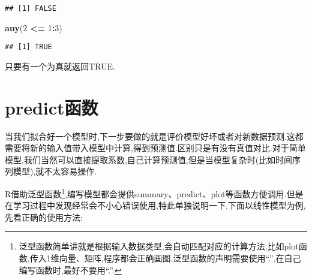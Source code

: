 \documentclass[]{ctexbook}
\newenvironment{Shaded}{\begin{snugshade}}{\end{snugshade}}
\newcommand{\DataTypeTok}[1]{\textcolor[rgb]{0.13,0.29,0.53}{#1}}
\newcommand{\DecValTok}[1]{\textcolor[rgb]{0.00,0.00,0.81}{#1}}
\newcommand{\KeywordTok}[1]{\textcolor[rgb]{0.13,0.29,0.53}{\textbf{#1}}}
\newcommand{\NormalTok}[1]{#1}
\newcommand{\OperatorTok}[1]{\textcolor[rgb]{0.81,0.36,0.00}{\textbf{#1}}}
\newcommand{\StringTok}[1]{\textcolor[rgb]{0.31,0.60,0.02}{#1}}
\begin{document}
\begin{verbatim}
## [1] FALSE
\end{verbatim}

\begin{Shaded}
\begin{Highlighting}[]
\KeywordTok{any}\NormalTok{(}\DecValTok{2} \OperatorTok{<=}\StringTok{ }\DecValTok{1}\OperatorTok{:}\DecValTok{3}\NormalTok{)}
\end{Highlighting}
\end{Shaded}

\begin{verbatim}
## [1] TRUE
\end{verbatim}

只要有一个为真就返回TRUE.

\hypertarget{predict}{%
\section{predict函数}\label{predict}}

当我们拟合好一个模型时,下一步要做的就是评价模型好坏或者对新数据预测.这都需要将新的输入值带入模型中计算,得到预测值.区别只是有没有真值对比.对于简单模型,我们当然可以直接提取系数,自己计算预测值,但是当模型复杂时(比如时间序列模型),就不太容易操作.

R借助泛型函数\footnote{泛型函数简单讲就是根据输入数据类型,会自动匹配对应的计算方法.比如plot函数,传入1维向量、矩阵,程序都会正确画图.泛型函数的声明需要使用``.'',在自己编写函数时,最好不要用``.''.},编写模型都会提供summary、predict、plot等函数方便调用.但是在学习过程中发现经常会不小心错误使用,特此单独说明一下.下面以线性模型为例,先看正确的使用方法:

\begin{Shaded}
\end{Shaded}
\end{document}
